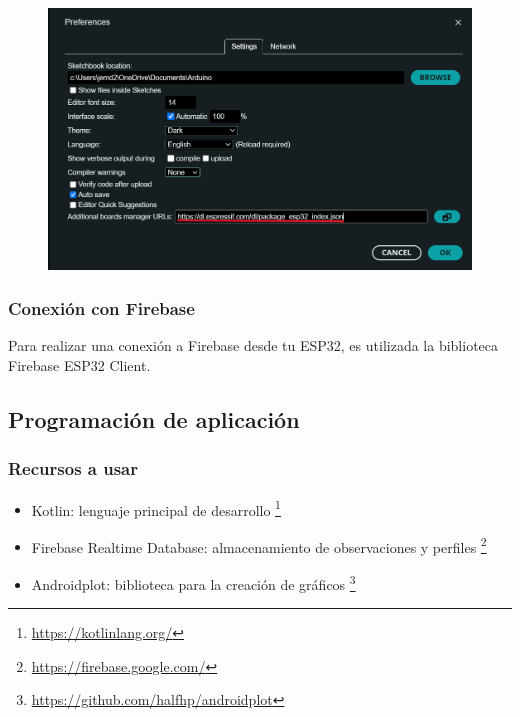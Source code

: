 \documentclass[../main]{subfiles}
\begin{document}
\begin{figure}[H]
	\centering
	\includegraphics[width = 13cm]{res/configuracionParaEsp32.png}
\end{figure}

\subsubsection{Conexión con Firebase}

Para realizar una conexión a Firebase desde tu ESP32, es utilizada la biblioteca
Firebase ESP32 Client.

\subsection{Programación de aplicación}

\setcounter{subsubsection}{-1}

\subsubsection{Recursos a usar}

\begin{itemize}
	\item Kotlin: lenguaje principal de desarrollo
	      \footnote{\url{https://kotlinlang.org/}}
	\item Firebase Realtime Database: almacenamiento de observaciones y perfiles
	      \footnote{\url{https://firebase.google.com/}}
	\item Androidplot: biblioteca para la creación de gráficos
	      \footnote{\url{https://github.com/halfhp/androidplot}}
\end{itemize}
\end{document}
